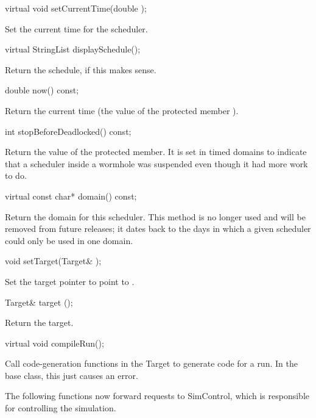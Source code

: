 \begin{example}
virtual void setCurrentTime(double );
\end{example}

Set the current time for the scheduler.

\begin{example}
virtual StringList displaySchedule();
\end{example}

Return the schedule, if this makes sense.

\begin{example}
double now() const;
\end{example}

Return the current time (the value of the protected member
).

\begin{example}
int stopBeforeDeadlocked() const;
\end{example}

Return the value of the  protected member.
It is set in timed domains to indicate that a scheduler inside a
wormhole was suspended even though it had more work to do.

\begin{example}
virtual const char* domain() const;
\end{example}

Return the domain for this scheduler.  This method is no longer used and
will be removed from future releases; it dates back to the days
in which a given scheduler could only be used in one domain.

\begin{example}
void setTarget(Target& );
\end{example}

Set the target pointer to point to .

\begin{example}
Target& target ();
\end{example}

Return the target.

\begin{example}
virtual void compileRun();
\end{example}

Call code-generation functions in the Target to generate
code for a run.
In the base class, this just causes an error.

The following functions now forward requests to SimControl,
which is responsible for controlling the simulation.


